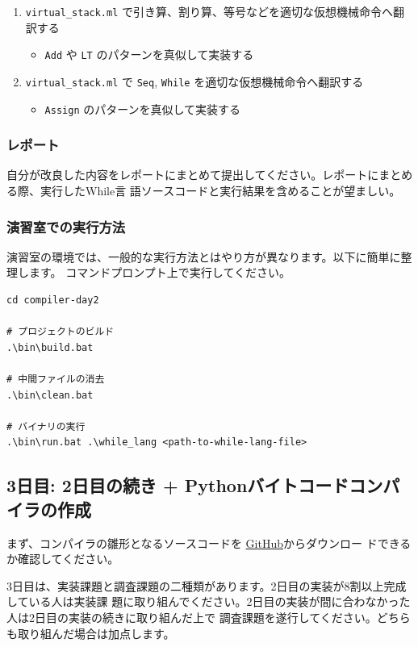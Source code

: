 \documentclass[a4paper,11pt]{jsarticle}
\begin{document}
\begin{enumerate}
\item \verb|virtual_stack.ml| で引き算、割り算、等号などを適切な仮想機械命令へ翻訳する
  \begin{itemize}
  \item \verb|Add| や \verb|LT| のパターンを真似して実装する
  \end{itemize}
\item \verb|virtual_stack.ml| で \verb|Seq|, \verb|While| を適切な仮想機械命令へ翻訳する
  \begin{itemize}
  \item \verb|Assign| のパターンを真似して実装する
  \end{itemize}
\end{enumerate}

\subsubsection{レポート}

自分が改良した内容をレポートにまとめて提出してください。レポートにまとめる際、実行したWhile言
語ソースコードと実行結果を含めることが望ましい。

\subsubsection{演習室での実行方法}

演習室の環境では、一般的な実行方法とはやり方が異なります。以下に簡単に整理します。
コマンドプロンプト上で実行してください。

\begin{lstlisting}
cd compiler-day2

# プロジェクトのビルド
.\bin\build.bat

# 中間ファイルの消去
.\bin\clean.bat

# バイナリの実行
.\bin\run.bat .\while_lang <path-to-while-lang-file>
\end{lstlisting}

\subsection{3日目: 2日目の続き + Pythonバイトコードコンパイラの作成}

まず、コンパイラの雛形となるソースコードを
\href{https://github.com/tmu-compiler-info-sys-exp-I/compiler-day3}{GitHub}からダウンロー
ドできるか確認してください。

3日目は、実装課題と調査課題の二種類があります。2日目の実装が8割以上完成している人は実装課
題に取り組んでください。2日目の実装が間に合わなかった人は2日目の実装の続きに取り組んだ上で
調査課題を遂行してください。どちらも取り組んだ場合は加点します。
\end{document}
